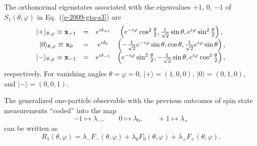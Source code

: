 \documentclass[fleqn,twoside]{article}      %
\begin{document}
The orthonormal eigenstates associated with the eigenvalues $+1$, $0$, $-1$ of
$S_1(\theta , \varphi )$ in Eq.~(\ref{e-2009-gtq-s3})
are
\begin{equation}
\label{l-soksp-ev}
\begin{array}{cccccccc}
\vert +\rangle_{\theta ,\varphi} \equiv {\bf x}_{+1}&=&e^{i\delta_{+1}}& \left(
e^{-i\varphi} \cos^2{\theta \over 2}, {1\over \sqrt{2}}   \sin \theta ,e^{i\varphi}  \sin^2{\theta \over 2}
\right),\\
\vert 0\rangle_{\theta ,\varphi} \equiv {\bf x}_{0}&=&e^{i\delta_0}& \left(
-{1\over \sqrt{2}} e^{-i\varphi} \sin \theta , \cos \theta , {1\over \sqrt{2}} e^{i\varphi}\sin \theta
\right),\\
\vert -\rangle_{\theta ,\varphi} \equiv {\bf x}_{-1}&=&e^{i\delta_{-1}}& \left(
e^{-i\varphi} \sin^2{\theta \over 2}, - {1\over \sqrt{2}}     \sin \theta , e^{i\varphi}\cos^2{\theta \over 2}
\right) ,
\end{array}
\end{equation}
respectively.
For vanishing angles $\theta =\varphi =0$,
$\vert +\rangle = (1,0,0)$,
$\vert 0\rangle = (0,1,0)$, and
$\vert -\rangle = (0,0,1)$.


The generalized one-particle observable with the previous outcomes of spin state measurements ``coded''
into the map
\begin{equation}
\label{2009-gtq-c1}
-1 \mapsto  \lambda_{-} ,\qquad
0 \mapsto   \lambda_{0}   ,\qquad
+1 \mapsto   \lambda_{+}
\end{equation}
can be written as
\begin{equation}
\label{2009-gtq-sso1}
R_1(\theta ,\varphi) = \lambda_{-} F_{-}(\theta ,\varphi) + \lambda_{0} F_0(\theta ,\varphi) +  \lambda_{+} F_{+}(\theta ,\varphi)
.
\end{equation}
\end{document}
